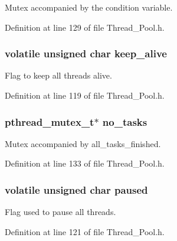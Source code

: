 Mutex accompanied by the condition variable. 



Definition at line 129 of file Thread\+\_\+\+Pool.\+h.

\hypertarget{struct_thread___pool_ac24a1c7364475077551efc2e48bda9d0}{}
\subsubsection[{keep\+\_\+alive}]{\setlength{\rightskip}{0pt plus 5cm}volatile unsigned char keep\+\_\+alive}\label{struct_thread___pool_ac24a1c7364475077551efc2e48bda9d0}


Flag to keep all threads alive. 



Definition at line 119 of file Thread\+\_\+\+Pool.\+h.

\hypertarget{struct_thread___pool_a82c4f8c176f73a4611cfd93d8182047e}{}
\subsubsection[{no\+\_\+tasks}]{\setlength{\rightskip}{0pt plus 5cm}pthread\+\_\+mutex\+\_\+t$\ast$ no\+\_\+tasks}\label{struct_thread___pool_a82c4f8c176f73a4611cfd93d8182047e}


Mutex accompanied by all\+\_\+tasks\+\_\+finished. 



Definition at line 133 of file Thread\+\_\+\+Pool.\+h.

\hypertarget{struct_thread___pool_aa3a3ac301929dcdd75a29d985167d7fa}{}
\subsubsection[{paused}]{\setlength{\rightskip}{0pt plus 5cm}volatile unsigned char paused}\label{struct_thread___pool_aa3a3ac301929dcdd75a29d985167d7fa}


Flag used to pause all threads. 



Definition at line 121 of file Thread\+\_\+\+Pool.\+h.

